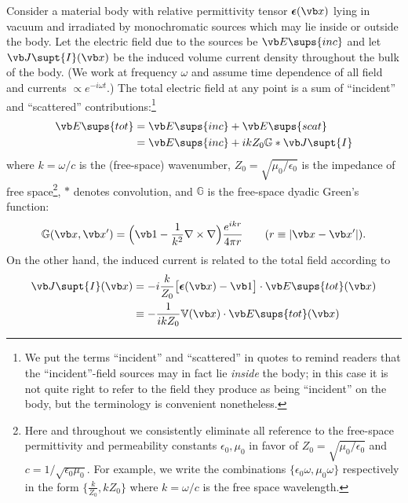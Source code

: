 \documentclass[letterpaper]{article}
\newcommand{\vbeps}{\boldsymbol{\epsilon}}
\begin{document}
Consider a material body with relative permittivity tensor
$\vbeps(\vb x)$ lying in vacuum and irradiated by monochromatic
sources which may lie inside or outside the body. 
Let the electric field due to the sources be $\vb E\sups{inc}$ 
and let $\vb J\supt{I}(\vb x)$ be the induced volume current
density throughout the bulk of the body. 
(We work at frequency $\omega$ and assume time dependence
of all field and currents $\propto e^{-i\omega t}$.)
The total electric field at any point is a sum of
``incident'' and ``scattered'' contributions:\footnote{We
put the terms ``incident'' and ``scattered'' in quotes
to remind readers that the ``incident''-field sources may
in fact lie \textit{inside} the body; in this case it is 
not quite right to refer to the field they produce as 
being ``incident'' on the body, but the terminology is 
convenient nonetheless.}
\begin{align}
 \vb E\sups{tot} &= \vb E\sups{inc} + \vb E\sups{scat}
\\
                 &= \vb E\sups{inc} + ikZ_0 \mathbb{G}*\vb J\supt{I}
\label{ETot}
\end{align}
where $k=\omega/c$ is the (free-space) wavenumber,
$Z_0=\sqrt{\mu_0/\epsilon_0}$ is the impedance of free 
space\footnote{Here and throughout we consistently eliminate
all reference to the free-space permittivity and
permeability constants $\epsilon_0,\mu_0$ in favor of
$Z_0=\sqrt{\mu_0/\epsilon_0}$ and $c=1/\sqrt{\epsilon_0 \mu_0}.$
For example, we write the combinations 
$\{\epsilon_0\omega, \mu_0\omega\}$ respectively in the form 
$\{\frac{k}{Z_0}, kZ_0\}$ where
$k=\omega/c$ is the free space wavelength.},
$*$ denotes convolution, and $\mathbb{G}$ is the free-space
dyadic Green's function:
$$ \mathbb{G}(\vb x, \vb x^\prime) = 
   \Big(\vb 1 - \frac{1}{k^2} \nabla \times \nabla \Big)
   \frac{e^{ikr}}{4\pi r}
   \qquad (r\equiv |\vb x-\vb x^\prime|).
$$
On the other hand, the induced current is related to the total field
according to
\begin{align*}
 \vb J\supt{I}(\vb x) 
&= -i\frac{k}{Z_0} \big[\vbeps(\vb x) - \vb 1\big]\cdot \vb E\sups{tot}(\vb x)
\\
&\equiv -\frac{1}{ikZ_0} \mathbb{V}(\vb x) \cdot \vb E\sups{tot}(\vb x)
\end{align*}
\end{document}

